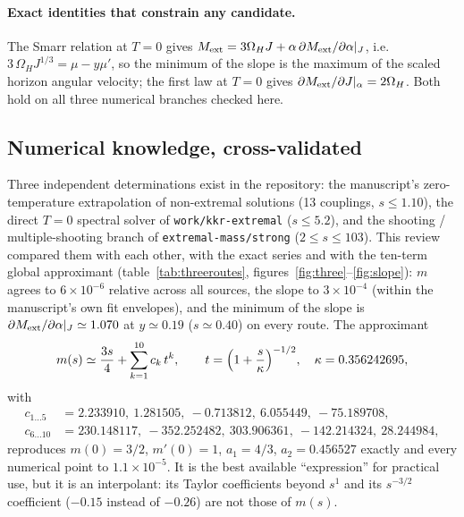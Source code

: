 \paragraph{Exact identities that constrain any candidate.} The Smarr relation at $T=0$ gives
$M_{\rm ext}=3\Omega_HJ+\alpha\,\partial M_{\rm ext}/\partial\alpha|_J$, i.e.
$3\,\Omega_HJ^{1/3}=\mu-y\mu'$, so the minimum of the slope is the maximum of the scaled horizon
angular velocity; the first law at $T=0$ gives $\partial M_{\rm ext}/\partial J|_\alpha=2\Omega_H$.
Both hold on all three numerical branches checked here.

\subsection*{Numerical knowledge, cross-validated}

Three independent determinations exist in the repository: the manuscript's zero-temperature
extrapolation of non-extremal solutions (13 couplings, $s\le1.10$), the direct $T=0$ spectral
solver of \texttt{work/kkr-extremal} ($s\le5.2$), and the shooting / multiple-shooting branch
of \texttt{extremal-mass/strong} ($2\le s\le103$). This review compared them with each other,
with the exact series and with the ten-term global approximant (table~\ref{tab:threeroutes},
figures~\ref{fig:three}--\ref{fig:slope}): $m$ agrees to $6\times10^{-6}$ relative across all
sources, the slope to $3\times10^{-4}$ (within the manuscript's own fit envelopes), and the
minimum of the slope is $\partial M_{\rm ext}/\partial\alpha|_J\simeq1.070$ at
$y\simeq0.19$ ($s\simeq0.40$) on every route. The approximant
\begin{equation}
 m(s)\simeq\frac{3s}{4}+\sum_{k=1}^{10}c_k\,t^k,\qquad t=\Bigl(1+\frac s\kappa\Bigr)^{-1/2},\quad
 \kappa=0.356242695,
 \label{eq:approx}
\end{equation}
with
\begin{equation*}
\begin{aligned}
 c_{1\ldots5}&=2.233910,\ 1.281505,\ -0.713812,\ 6.055449,\ -75.189708,\\
 c_{6\ldots10}&=230.148117,\ -352.252482,\ 303.906361,\ -142.214324,\ 28.244984,
\end{aligned}
\end{equation*}
reproduces $m(0)=3/2$, $m'(0)=1$,
$a_1=4/3$, $a_2=0.456527$ exactly and every numerical point to $1.1\times10^{-5}$. It is the
best available ``expression'' for practical use, but it is an interpolant: its Taylor
coefficients beyond $s^1$ and its $s^{-3/2}$ coefficient ($-0.15$ instead of $-0.26$) are not
those of $m(s)$.

